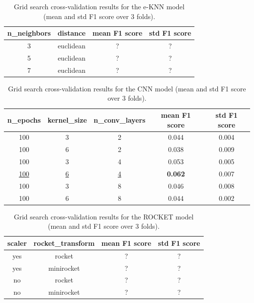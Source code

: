 \documentclass[a4paper,11pt]{article}
\begin{document}
\begin{table}[htbp]
    \centering
    \begin{tabular}{|c|c|c|c|}
        \hline
        \textbf{n\_neighbors} & \textbf{distance} & \textbf{mean F1 score} & \textbf{std F1 score} \\
        \hline
        3 & euclidean & ? & ? \\
        5 & euclidean & ? & ? \\
        7 & euclidean & ? & ? \\
        \hline
    \end{tabular}
    \caption{Grid search cross-validation results for the e-KNN model (mean and std F1 score over 3 folds).}
    \label{tab:cv-results-knn}
\end{table}

\begin{table}[htbp]
    \centering
    \begin{tabular}{|c|c|c|c|c|}
        \hline
        \textbf{n\_epochs} & \textbf{kernel\_size} & \textbf{n\_conv\_layers} & \textbf{mean F1 score} & \textbf{std F1 score} \\
        \hline
        100 & 3 & 2 & 0.044 & 0.004 \\
        100 & 6 & 2 & 0.038 & 0.009 \\
        100 & 3 & 4 & 0.053 & 0.005 \\
        \underline{100} & \underline{6} & \underline{4} & \textbf{0.062} & 0.007 \\
        100 & 3 & 8 & 0.046 & 0.008 \\
        100 & 6 & 8 & 0.044 & 0.002 \\
        \hline
    \end{tabular}
    \caption{Grid search cross-validation results for the CNN model (mean and std F1 score over 3 folds).}
    \label{tab:cv-results-cnn}
\end{table}

\begin{table}[htbp]
    \centering
    \begin{tabular}{|c|c|c|c|}
        \hline
        \textbf{scaler} & \textbf{rocket\_transform} & \textbf{mean F1 score} & \textbf{std F1 score} \\
        \hline
        yes & rocket & ? & ? \\
        yes & minirocket & ? & ? \\
        no & rocket & ? & ? \\
        no & minirocket & ? & ? \\
        \hline
    \end{tabular}
    \caption{Grid search cross-validation results for the ROCKET model (mean and std F1 score over 3 folds).}
    \label{tab:cv-results-rocket}
\end{table}
\end{document}
